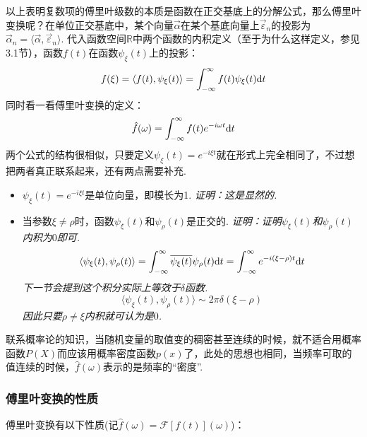 以上表明复数项的傅里叶级数的本质是函数在正交基底上的分解公式，那么傅里叶变换呢？在单位正交基底中，某个向量\(\vec{\alpha}\)在某个基底向量上\(\vec{\varepsilon}_n\)的投影为\(\vec{\alpha}_n = \langle \vec{\alpha},\vec{\varepsilon}_n \rangle\). 代入函数空间\(\mathbb{R}\)中两个函数的内积定义（至于为什么这样定义，参见3.1节），函数\(f(t)\)在函数\(\psi_{\xi}(t)\)上的投影：
\[f(\xi) = \langle f(t), \psi_{\xi}(t) \rangle = \int_{-\infty}^{\infty}f(t)\psi_{\xi}(t){\rm d}t\]
同时看一看傅里叶变换的定义：
\[\hat{f}(\omega) = \int_{-\infty}^{\infty}f(t)e^{-i\omega t}{\rm d}t\]
两个公式的结构很相似，只要定义\(\psi_{\xi}(t)=e^{-i\xi t}\)就在形式上完全相同了，不过想把两者真正联系起来，还有两点需要补充.
\begin{itemize}
    \item [\(\bullet\)] \(\psi_{\xi}(t)=e^{-i\xi t}\)是单位向量，即模长为1. 
    \newline
    \textit{
        证明：这是显然的.
    }
    \item [\(\bullet\)] 当参数\(\xi\neq\rho\)时，函数\(\psi_{\xi}(t)\)和\(\psi_{\rho}(t)\)是正交的. 
    \newline
    \textit{
        证明：证明\(\psi_{\xi}(t)\)和\(\psi_{\rho}(t)\)内积为\(0\)即可.
        \[\langle \psi_{\xi}(t),\psi_{\rho}(t) \rangle = \int_{-\infty}^{\infty}\overline{\psi_{\xi}(t)}\psi_{\rho}(t){\rm d}t = \int_{-\infty}^{\infty}e^{-i(\xi-\rho)t}{\rm d}t\]
        下一节会提到这个积分实际上等效于\(\delta\)函数.
        \[\langle \psi_{\xi}(t),\psi_{\rho}(t) \rangle \sim 2\pi\delta(\xi-\rho)\]
        因此只要\(\rho \neq \xi\)内积就可认为是\(0\).
    }
\end{itemize}

联系概率论的知识，当随机变量的取值变的稠密甚至连续的时候，就不适合用概率函数\(P(X)\)而应该用概率密度函数\(p(x)\)了，此处的思想也相同，当频率可取的值连续的时候，\(\hat{f}(\omega)\)表示的是频率的“密度”.

\subsubsection{傅里叶变换的性质}

傅里叶变换有以下性质(记\(\hat{f}(\omega)=\mathcal{F}[f(t)](\omega)\))：\\

